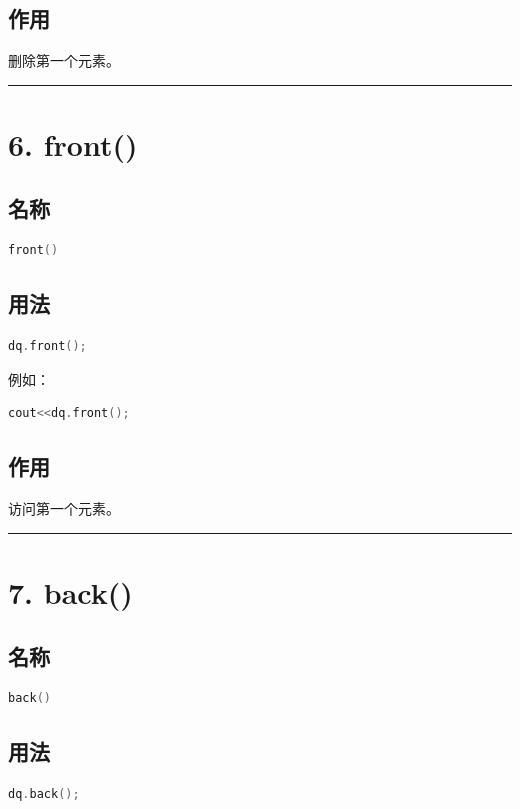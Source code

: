 \documentclass[9pt,twocolumn]{extarticle}
\begin{document}
\subsection{作用}
删除第一个元素。

\noindent\rule{\linewidth}{0.4pt}

\section{6. front()}

\subsection{名称}
\begin{lstlisting}[language=C++]
front()
\end{lstlisting}

\subsection{用法}
\begin{lstlisting}[language=C++]
dq.front();
\end{lstlisting}
例如：
\begin{lstlisting}[language=C++]
cout<<dq.front();
\end{lstlisting}

\subsection{作用}
访问第一个元素。

\noindent\rule{\linewidth}{0.4pt}

\section{7. back()}

\subsection{名称}
\begin{lstlisting}[language=C++]
back()
\end{lstlisting}

\subsection{用法}
\begin{lstlisting}[language=C++]
dq.back();
\end{lstlisting}
\end{document}
